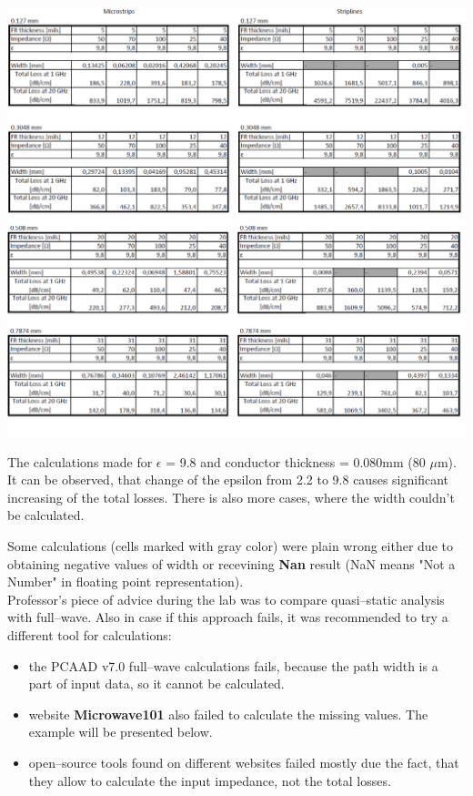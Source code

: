 \documentclass[eng,printmode]{mgr}
\begin{document}
\begin{table}[h]
	\centering
	\includegraphics[width=1\linewidth]{table2a}
	\label{fig:microm2}
	\caption{The calculations made for $\epsilon$ = 9.8 and conductor thickness = 0.080mm (80 $\mu$m). It can be observed, that change of the epsilon from 2.2 to 9.8 causes significant increasing of the total losses. There is also more cases, where the width couldn't be calculated.}
\end{table}

Some calculations (cells marked with gray color) were plain wrong either due to obtaining negative values of width or recevining \textbf{Nan} result (NaN means "Not a Number" in floating point representation).\\
Professor's piece of advice during the lab was to compare quasi--static analysis with full--wave. Also in case if this approach fails, it was recommended to try a different tool for calculations:
\begin{itemize}
	\item the PCAAD v7.0 full--wave calculations fails, because the path width is a part of input data, so it cannot be calculated.
	\item website \textbf{Microwave101} also failed to calculate the missing values. The example will be presented below.
	\item open--source tools found on different websites failed mostly due the fact, that they allow to calculate the input impedance, not the total losses.
\end{itemize}
\end{document}

